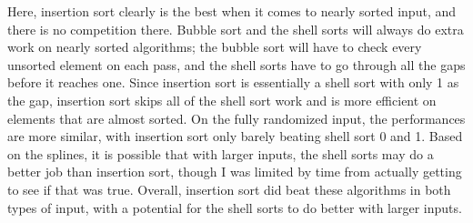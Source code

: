 \documentclass{article}
\begin{document}
    \noindent
    Here, insertion sort clearly is the best when it comes to nearly sorted
    input, and there is no competition there. Bubble sort and the shell sorts
    will always do extra work on nearly sorted algorithms; the bubble sort will
    have to check every unsorted element on each pass, and the shell sorts have
    to go through all the gaps before it reaches one. Since insertion sort is
    essentially a shell sort with only 1 as the gap, insertion sort skips all of
    the shell sort work and is more efficient on elements that are almost 
    sorted.
    \nextblurb
    On the fully randomized input, the performances are more similar, with
    insertion sort only barely beating shell sort 0 and 1. Based on the splines,
    it is possible that with larger inputs, the shell sorts may do a better job
    than insertion sort, though I was limited by time from actually getting to
    see if that was true. Overall, insertion sort did beat these algorithms in 
    both types of input, with a potential for the shell sorts to do better with
    larger inputs.
\end{document}
